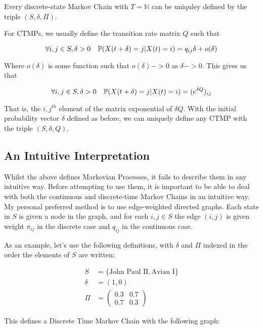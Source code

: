 Every discrete-state Markov Chain with $T=\mathbb{N}$ can be uniquley defined by the triple $(S,\delta,\Pi)$.

For CTMPs, we usually define the transition rate matrix $Q$ such that

$$
\forall i,j \in S, \delta>0 \quad \mathbb{P} (X(t+\delta)=j|X(t)=i) = q_{ij}\delta + o(\delta)
$$

Where $o(\delta)$ is some function such that $o(\delta) -> 0$ as $\delta -> 0$. This gives us that

$$
\forall i,j \in S, \delta>0 \quad \mathbb{P} (X(t+\delta)=j|X(t)=i) = (e^{\delta Q})_{ij}
$$

That is, the $i,j^{th}$ element of the matrix exponential of $\delta Q$. With the initial probability vector $\delta$ defined as before, we can uniquely define any CTMP with the triple $(S,\delta,Q)$.

\subsection{An Intuitive Interpretation}

Whilst the above defines Markovian Processes, it fails to describe them in any intuitive way. Before attempting to use them, it is important to be able to deal with both the continuous and discrete-time Markov Chains in an intuitive way. My personal preferred method is to use edge-weighted directed graphs\cite{mwgraph}. Each state in $S$ is given a node in the graph, and for each $i,j \in S$ the edge $(i,j)$ is given weight $\pi_{ij}$ in the discrete case and $q_{ij}$ in the continuous case.

As an example, let's use the following definitions, with $\delta$ and $\Pi$ indexed in the order the elements of $S$ are written;

\begin{align*}
S &= \{\mbox{John Paul II}, \mbox{Avian I}\}\\
\delta &= \left(1,0\right)\\
\Pi &=
\left(
\begin{matrix}
0.3&0.7\\
0.7&0.3
\end{matrix}
\right)
\end{align*}

This defines a Discrete Time Markov Chain with the following graph:


